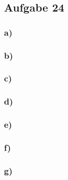 \subsection*{Aufgabe 24}

\subsubsection*{a)}

\subsubsection*{b)}

\subsubsection*{c)}

\subsubsection*{d)}

\subsubsection*{e)}

\subsubsection*{f)}

\subsubsection*{g)}
